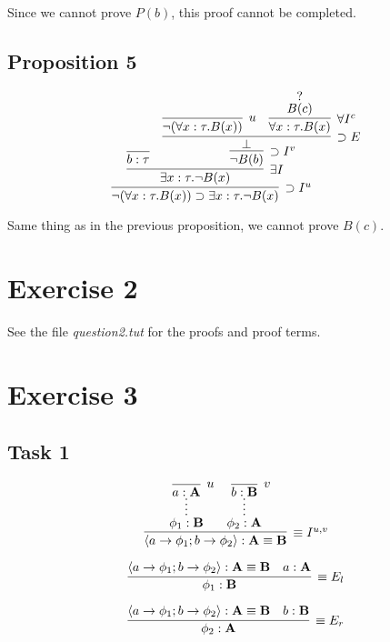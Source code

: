 \documentclass[11pt]{article}
\begin{document}
Since we cannot prove $P(b)$, this proof cannot be completed.

\subsection{Proposition 5}

\[
\infer[\supset I^u]
  {\neg(\forall x:\tau. B(x)) \supset \exists x:\tau. \neg B(x)}
  {
    \infer[\exists I]
      {\exists x:\tau. \neg B(x)}
      {
        \infer{b:\tau}{} &
        \infer[\supset I^v]
          {\neg B(b)}
          {
            \infer[\supset E]
              {\bot}
              {
                \infer[u]{\neg(\forall x:\tau. B(x))}{} &
                \infer[\forall I^c]
                  {\forall x:\tau. B(x)}
                  {
                    \deduce{B(c)}{?}
                  }
              }
          }
      }
  }
\]

Same thing as in the previous proposition, we cannot prove $B(c)$.

\section{Exercise 2}

See the file {\it question2.tut} for the proofs and proof terms.


\section{Exercise 3}

\subsection{Task 1}
\[
\infer[\equiv I^{u,v}]
   { \langle a \to \phi_1; b \to \phi_2 \rangle: \mathbf{A \equiv B}}
   {
     \infer*{\phi_1:\mathbf{B}}{\infer[u]{a:\mathbf{A}}{}} &
     \infer*{\phi_2:\mathbf{A}}{\infer[v]{b:\mathbf{B}}{}}
   }
\]

\[
\infer[\equiv E_l]
  {\phi_1:\mathbf{B}}
  {
    \langle a \to \phi_1; b \to \phi_2 \rangle: \mathbf{A \equiv B} &
    a:\mathbf{A}
  }
\]

\[
\infer[\equiv E_r]
  {\phi_2:\mathbf{A}}
  {
     \langle a \to \phi_1; b \to \phi_2 \rangle: \mathbf{A \equiv B} &
    b:\mathbf{B}
  }
\]
\end{document}
